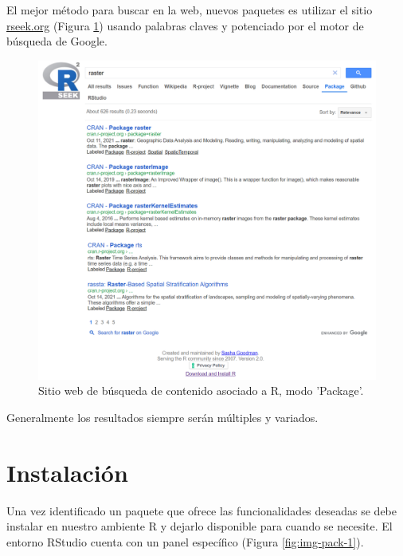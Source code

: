 \documentclass[
]{book}
\begin{document}
El mejor método para buscar en la web, nuevos paquetes es utilizar el sitio \href{https://rseek.org/}{rseek.org} (Figura \ref{fig:img-pack-3}) usando palabras claves y potenciado por el motor de búsqueda de Google.

\begin{figure}

{\centering \includegraphics[width=18.96in]{img/pack3} 

}

\caption{Sitio web de búsqueda de contenido asociado a R, modo 'Package'.}\label{fig:img-pack-3}
\end{figure}

Generalmente los resultados siempre serán múltiples y variados.

\hypertarget{pack-install}{%
\section{Instalación}\label{pack-install}}

Una vez identificado un paquete que ofrece las funcionalidades deseadas se debe instalar en nuestro ambiente R y dejarlo disponible para cuando se necesite. El entorno RStudio cuenta con un panel específico (Figura \ref{fig:img-pack-1}).
\end{document}
